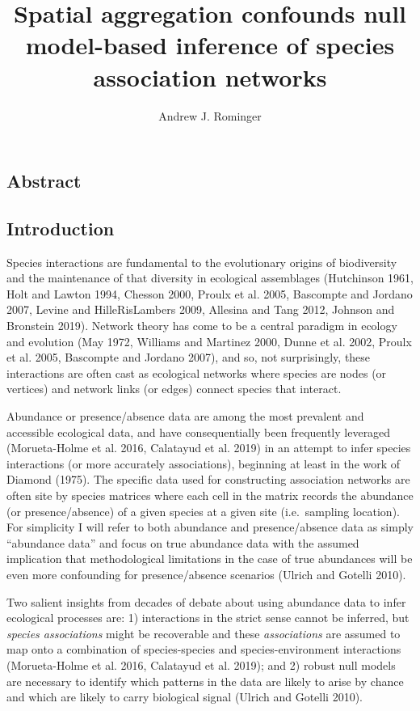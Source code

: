 \documentclass[
  letterpaper,
  DIV=11,
  numbers=noendperiod]{scrartcl}
\title{Spatial aggregation confounds null model-based inference of
species association networks}
\author{Andrew J. Rominger}
\date{}
\begin{document}
\maketitle


\linenumbers

\subsection{Abstract}\label{abstract}

\subsection{Introduction}\label{introduction}

Species interactions are fundamental to the evolutionary origins of
biodiversity and the maintenance of that diversity in ecological
assemblages (Hutchinson 1961, Holt and Lawton 1994, Chesson 2000, Proulx
et al. 2005, Bascompte and Jordano 2007, Levine and HilleRisLambers
2009, Allesina and Tang 2012, Johnson and Bronstein 2019). Network
theory has come to be a central paradigm in ecology and evolution (May
1972, Williams and Martinez 2000, Dunne et al. 2002, Proulx et al. 2005,
Bascompte and Jordano 2007), and so, not surprisingly, these
interactions are often cast as ecological networks where species are
nodes (or vertices) and network links (or edges) connect species that
interact.

Abundance or presence/absence data are among the most prevalent and
accessible ecological data, and have consequentially been frequently
leveraged (Morueta-Holme et al. 2016, Calatayud et al. 2019) in an
attempt to infer species interactions (or more accurately associations),
beginning at least in the work of Diamond (1975). The specific data used
for constructing association networks are often site by species matrices
where each cell in the matrix records the abundance (or
presence/absence) of a given species at a given site (i.e.~sampling
location). For simplicity I will refer to both abundance and
presence/absence data as simply ``abundance data'' and focus on true
abundance data with the assumed implication that methodological
limitations in the case of true abundances will be even more confounding
for presence/absence scenarios (Ulrich and Gotelli 2010).

Two salient insights from decades of debate about using abundance data
to infer ecological processes are: 1) interactions in the strict sense
cannot be inferred, but \emph{species associations} might be recoverable
and these \emph{associations} are assumed to map onto a combination of
species-species and species-environment interactions (Morueta-Holme et
al. 2016, Calatayud et al. 2019); and 2) robust null models are
necessary to identify which patterns in the data are likely to arise by
chance and which are likely to carry biological signal (Ulrich and
Gotelli 2010).
\end{document}

